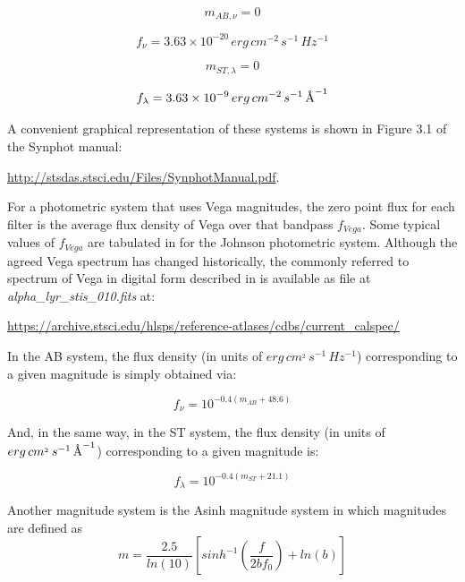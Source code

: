 \documentclass[11pt,a4paper]{ivoa}
\newcommand{\angstrom}{\mbox{\normalfont\AA}}
\begin{document}
\begin{equation} \label{eq:7_0}
m_{AB,\nu } = 0
\end{equation}

\begin{equation} \label{eq:8}
f_\nu = 3.63\times 10^{-20}\,erg\,cm^{-2}\,s^{-1}\,Hz^{-1}
\end{equation}

\begin{equation} \label{eq:9}
m_{ST,\lambda } = 0
\end{equation}

\begin{equation} \label{eq:10}
f_\lambda = 3.63\times 10^{-9}\,erg\,cm^{-2}\,s^{-1}\,\angstrom^{-1}
\end{equation}


A convenient graphical representation of these systems is shown in
Figure 3.1 of the Synphot manual:

\url{http://stsdas.stsci.edu/Files/SynphotManual.pdf}.
\par

For a photometric system that uses Vega magnitudes, the zero point
flux for each filter is the average flux density of Vega over that
bandpass $f_{Vega}$. Some typical values of $f_{Vega}$ are tabulated in
\citep{2001eaa..book.....M} for the Johnson photometric system. Although
the agreed Vega spectrum has changed historically, the commonly referred to
spectrum of Vega in digital form described in \citep{2004AJ....127.3508B}
is available as file at \emph{alpha\_lyr\_stis\_010.fits} at:\par
\url{https://archive.stsci.edu/hlsps/reference-atlases/cdbs/current_calspec/}
\par

In the AB system, the flux density (in units of $erg\, cm^{_2}\, s^{-1}\, Hz^{-1}$)
corresponding to a given magnitude is simply obtained via:

\begin{equation} \label{eq:11}
f_{\nu} = 10^{-0.4(m_{AB}+48.6)}
\end{equation}

And, in the same way, in the ST system, the flux density (in units of $erg\,
cm^{_2}\, s^{-1}\, \angstrom^{-1}$) corresponding to a given magnitude is:

\begin{equation} \label{eq:12}
f_{\lambda} = 10^{-0.4(m_{ST}+21.1)}
\end{equation}

Another magnitude system is the Asinh magnitude system in which magnitudes
are defined as
\begin{equation} \label{eq:13}
m = \frac{2.5}{ln(10)} \left[ sinh^{-1}(\frac{f}{2bf_0}) +ln(b) \right]
\end{equation}
\end{document}
